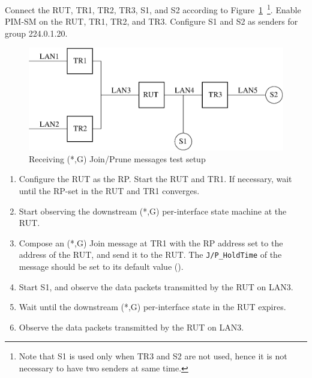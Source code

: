 \documentclass[11pt]{report}
\begin{document}
Connect the RUT, TR1, TR2, TR3, S1, and S2 according to
Figure~\ref{fig:receiving_wc_join_prune_messages}~\footnote{Note that S1 is
used only when TR3 and S2 are not used, hence it is not necessary to have two
senders at same time.}.
Enable PIM-SM on the RUT, TR1, TR2, and TR3.
Configure S1 and S2 as senders for group 224.0.1.20.

\begin{figure}[htbp]
  \begin{center}
    \includegraphics[scale=0.8]{figs/pim_test_4_2_receiving_wc_join_prune_messages}
    \caption{Receiving (*,G) Join/Prune messages test setup}
    \label{fig:receiving_wc_join_prune_messages}
  \end{center}
\end{figure}



\begin{enumerate}

  \item Configure the RUT as the RP. Start the RUT and TR1. If
  necessary, wait until the RP-set in the RUT and TR1 converges.

  \item Start observing the downstream (*,G) per-interface state
  machine at the RUT.

  \item Compose an (*,G) Join message at TR1 with the RP address set
  to the address of the RUT, and send it to the RUT.
  The \verb=J/P_HoldTime= of the message should be set to its default
  value ({\PimsmJPHoldTime}).

  \item Start S1, and observe the data packets transmitted by the RUT on
  LAN3.

  \item Wait until the downstream (*,G) per-interface state in the RUT
  expires.

  \item Observe the data packets transmitted by the RUT on LAN3.

\end{enumerate}
\end{document}
